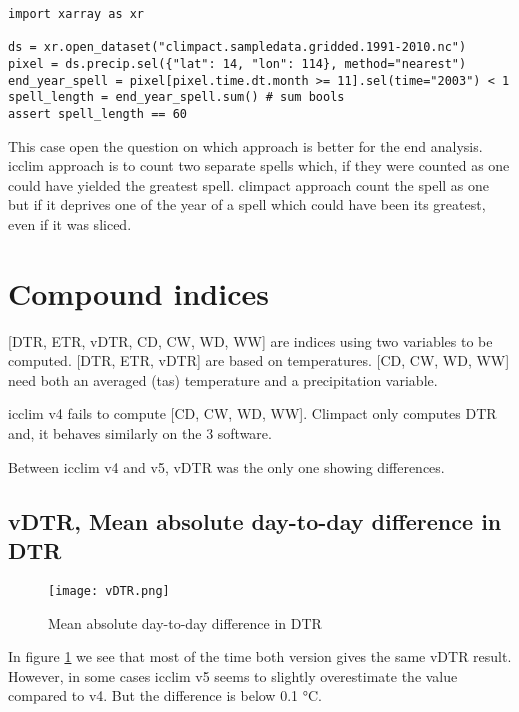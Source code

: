 \documentclass[a4paper,11pt]{article}
\begin{document}
    \begin{minipage}{\linewidth}
    \begin{lstlisting}
import xarray as xr

ds = xr.open_dataset("climpact.sampledata.gridded.1991-2010.nc")
pixel = ds.precip.sel({"lat": 14, "lon": 114}, method="nearest")
end_year_spell = pixel[pixel.time.dt.month >= 11].sel(time="2003") < 1
spell_length = end_year_spell.sum() # sum bools
assert spell_length == 60
    \end{lstlisting}
    \end{minipage}

    This case open the question on which approach is better for the end analysis.
    icclim approach is to count two separate spells which, if they were counted as one could have yielded the greatest spell.
    climpact approach count the spell as one but if it deprives one of the year of a spell which could have been its greatest, even if it was 
    sliced.
    


    \section{Compound indices}
        [DTR, ETR, vDTR, CD, CW, WD, WW] are indices using two variables to be computed.
        [DTR, ETR, vDTR] are based on temperatures.
        [CD, CW, WD, WW] need both an averaged (tas) temperature and a precipitation variable.
        
        icclim v4 fails to compute [CD, CW, WD, WW].
        Climpact only computes DTR and, it behaves similarly on the 3 software. 

        Between icclim v4 and v5, vDTR was the only one showing differences.

        \subsection{vDTR, Mean absolute day-to-day difference in DTR}
        \begin{figure}[!hbt]
            \centering
            \texttt{[image: vDTR.png]}
            \caption{Mean absolute day-to-day difference in DTR}
            \label{figure/vdtr}
        \end{figure}

        
        In figure \ref{figure/vdtr} we see that most of the time both version gives the same vDTR result.
        However, in some cases icclim v5 seems to slightly overestimate the value compared to v4. But the difference is below 0.1 °C.
\end{document}
